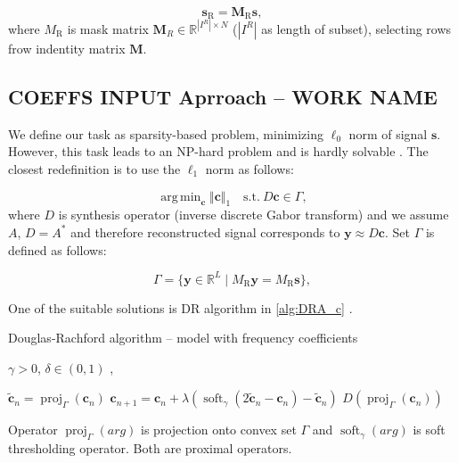 \documentclass[conference]{IEEEtran}
\begin{document}
\begin{equation*}
	\mathbf{s}_{\mathrm{R}} = \mathbf{M}_{\mathrm{R}}\mathbf{s},
\end{equation*}
where $  M_{\mathrm{R}} $ is mask matrix $\mathbf{M}_{R} \in \mathbb{R} ^ { |I^R| \times N}$ ($ |I^R|$ as length of subset), selecting rows frow indentity matrix $ \mathbf{M} $\cite{Adler2012}.




\subsection{COEFFS INPUT Aprroach -- WORK NAME}\label{subsec:freqcoef}

We define our task as sparsity-based problem, minimizing $ \ell_0 $ norm of signal $ \mathbf{s} $.
However, this task leads to an NP-hard problem and is hardly solvable \cite{Mokry2020}.
The closest redefinition is to use the $ \ell_1 $ norm as follows:

\begin{equation*}
 \mathop {\operatorname{arg \, min}}_\mathbf {c}\Vert \mathbf {c}\Vert _1 \quad \text{s.t.}\ D\mathbf {c}\in \Gamma, \tag{1}
\end{equation*} 
where $ D $ is synthesis operator (inverse discrete Gabor transform) and we assume $ A $, $ D = A^* $ and therefore reconstructed signal corresponds to $ \mathbf {y} \approx  D\mathbf {c}$.
Set $ \Gamma $ is defined as follows:

\begin{equation*} \Gamma = \lbrace \mathbf {y}\in \mathbb {R}^L\mid M_{\mathrm{R}}\mathbf {y}=M_{\mathrm{R}}\mathbf {s}\rbrace, \tag{2}\end{equation*}

One of the suitable solutions is DR algorithm in \ref{alg:DRA_c} \cite{Mokry2020}.

\begin{algorithm}
	\caption{Douglas-Rachford algorithm -- model with frequency coefficients}
	\begin{algorithmic}[1]\label{alg:DRA_c}
		\renewcommand{\algorithmicrequire}{\textbf{Input:}}
		\renewcommand{\algorithmicensure}{\textbf{Output:}}
		\REQUIRE  $ \gamma > 0 $, $ \delta  \in (0,1)$ ,
		
		\STATE $\mathbf{\widetilde{c}}_n=\operatorname{proj}_{\Gamma}(\mathbf{c}_n) $ 
		\STATE $ \mathbf{c}_{n+1} = \mathbf{c}_n + \lambda \left( \operatorname{soft}_{\gamma}\left(2\mathbf{\widetilde{c}}_n-\mathbf{c}_n \right)-\mathbf{\widetilde{c}}_n\right)$
		\ENDFOR
		\RETURN $D(\operatorname{proj}_{\Gamma}(\mathbf{c}_n))$ 
	\end{algorithmic} 
\end{algorithm}
Operator $ \operatorname{proj}_{\Gamma}(arg)$ is projection onto convex set $ \Gamma $ and $\operatorname{soft}_{\gamma}(arg)$ is soft thresholding operator.
Both are proximal operators.
\end{document}

